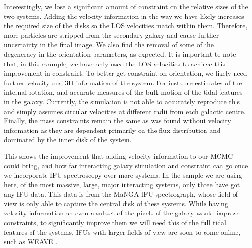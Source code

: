 Interestingly, we lose a significant amount of constraint on the relative sizes of the two systems. Adding the velocity information in the way we have likely increases the required size of the disks so the LOS velocities match within them. Therefore, more particles are stripped from the secondary galaxy and cause further uncertainty in the final image. We also find the removal of some of the degeneracy in the orientation parameters, as expected. It is important to note that, in this example, we have only used the LOS velocities to achieve this improvement in constraint. To better get constraint on orientation, we likely need further velocity and 3D information of the system. For instance estimates of the internal rotation, and accurate measures of the bulk motion of the tidal features in the galaxy. Currently, the simulation is not able to accurately reproduce this and simply assumes circular velocities at different radii from each galactic centre. Finally, the mass constraints remain the same as was found without velocity information as they are dependent primarily on the flux distribution and dominated by the inner disk of the system.


This shows the improvement that adding velocity information to our MCMC could bring, and how far interacting galaxy simulation and constraint can go once we incorporate IFU spectroscopy over more systems. In the sample we are using here, of the most massive, large, major interacting systems, only three have got any IFU data. This data is from the MaNGA \citep{2015ApJ...798....7B} IFU spectrograph, whose field of view is only able to capture the central disk of these systems. While having velocity information on even a subset of the pixels of the galaxy would improve constraints, to significantly improve them we will need this of the full tidal features of the systems. IFUs with larger fields of view are soon to come online, such as WEAVE \citep{2014SPIE.9147E..0LD}. 

